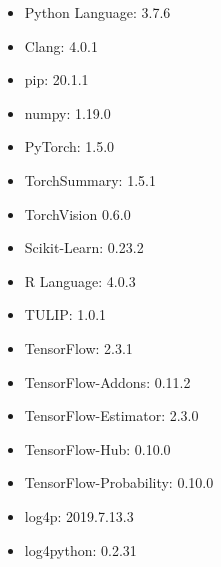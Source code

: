 \begin{itemize}
	\item
	Python Language: 3.7.6
	\item
	Clang: 4.0.1
	\item
	pip: 20.1.1
	\item  
	numpy: 1.19.0\\
	\item
	PyTorch: 1.5.0
	\item
	TorchSummary: 1.5.1
	\item
	TorchVision 0.6.0
	\item
	Scikit-Learn: 0.23.2\\
	\item
	R Language: 4.0.3
	\item
	TULIP: 1.0.1
	\item
	TensorFlow: 2.3.1\\
	\item
	TensorFlow-Addons: 0.11.2
	\item
	TensorFlow-Estimator: 2.3.0
	\item
	TensorFlow-Hub: 0.10.0
	\item
	TensorFlow-Probability: 0.10.0\\
	\item
	log4p: 2019.7.13.3
	\item
	log4python: 0.2.31
\end{itemize}
